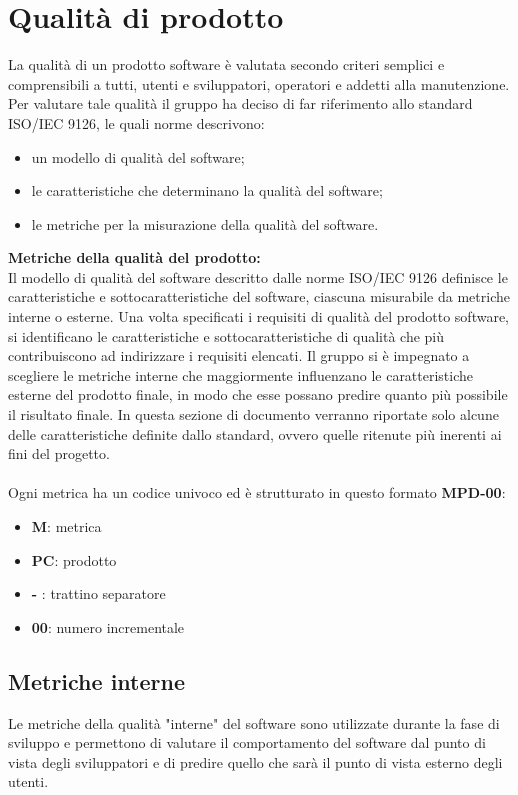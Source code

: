 \section{Qualità di prodotto}
La qualità di un prodotto software è valutata secondo criteri semplici e comprensibili a tutti, utenti e sviluppatori, operatori e addetti alla manutenzione.
Per valutare tale qualità il gruppo \Gruppo ha deciso di far riferimento allo standard ISO/IEC 9126, le quali norme descrivono:
\begin{itemize}
\item un modello di qualità del software; 
\item le caratteristiche che determinano la qualità del software;
\item le metriche per la misurazione della qualità del software.
\end{itemize}

\textbf{Metriche della qualità del prodotto:}\\
Il modello di qualità del software descritto dalle norme ISO/IEC 9126 definisce le caratteristiche e sottocaratteristiche del software, ciascuna misurabile da metriche interne o esterne.
Una volta specificati i requisiti di qualità del prodotto software, si identificano le caratteristiche e sottocaratteristiche di qualità che più contribuiscono ad indirizzare i requisiti elencati.
Il gruppo \Gruppo si è impegnato a scegliere le metriche interne che maggiormente influenzano le caratteristiche esterne del prodotto finale, in modo che esse possano predire quanto più possibile il risultato finale.
In questa sezione di documento verranno riportate solo alcune delle caratteristiche definite dallo standard, ovvero quelle ritenute più inerenti ai fini del progetto.\\ \\
Ogni metrica ha un codice univoco ed è strutturato in questo formato \textbf{MPD-00}:
\begin{itemize}
    \item \textbf{M}: metrica
    \item \textbf{PC}: prodotto
    \item \textbf{-} : trattino separatore
    \item \textbf{00}: numero incrementale
\end{itemize}
\subsection{Metriche interne}
 Le metriche della qualità "interne" del software sono utilizzate durante la fase di sviluppo e permettono di valutare il comportamento del software dal punto di vista degli sviluppatori e di predire quello che sarà il punto di vista esterno degli utenti.
